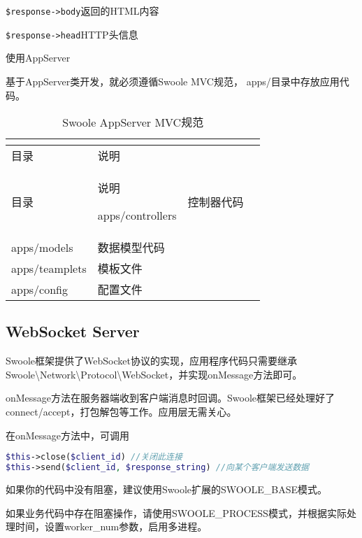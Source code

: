 \begin{compactitem}
\begin{compactenum}
\item \texttt{\$response->body}返回的HTML内容
\item \texttt{\$response->head}HTTP头信息
\end{compactenum}

\item 使用AppServer

基于AppServer类开发，就必须遵循Swoole MVC规范， apps/目录中存放应用代码。


\begin{longtable}{|m{80pt}|m{80pt}|}
\tabularnewline\hline
目录	&说明
\endhead

\caption{Swoole AppServer MVC规范}\\
\hline
目录	&说明
\endfirsthead

\endfoot

\endlastfoot

\hline
apps/controllers	&控制器代码\\
\hline
apps/models		&数据模型代码\\
\hline
apps/teamplets	&模板文件\\
\hline
apps/config		&配置文件\\
\hline
\end{longtable}

\end{compactitem}

\subsection{WebSocket Server}




Swoole框架提供了WebSocket协议的实现，应用程序代码只需要继承Swoole\textbackslash Network\textbackslash Protocol\textbackslash WebSocket，并实现onMessage方法即可。

onMessage方法在服务器端收到客户端消息时回调。Swoole框架已经处理好了connect/accept，打包解包等工作。应用层无需关心。

在onMessage方法中，可调用


\begin{lstlisting}[language=PHP]
$this->close($client_id) //关闭此连接
$this->send($client_id, $response_string) //向某个客户端发送数据
\end{lstlisting}

\begin{compactitem}
\item 如果你的代码中没有阻塞，建议使用Swoole扩展的SWOOLE\_BASE模式。
\item 如果业务代码中存在阻塞操作，请使用SWOOLE\_PROCESS模式，并根据实际处理时间，设置worker\_num参数，启用多进程。
\end{compactitem}


